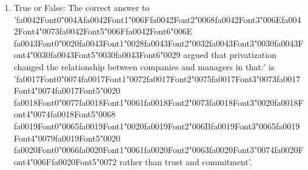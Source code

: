 \documentclass[12pt]{article}
\begin{document}
\begin{enumerate}[label=\arabic*.]
\item True or False: The correct answer to '{\csname fa0042Font0\endcsname\char"004A}{\csname fa0042Font1\endcsname\char"006F}{\csname fa0042Font2\endcsname\char"0068}{\csname fa0042Font3\endcsname\char"006E}{\csname fa0042Font4\endcsname\char"0073}{\csname fa0042Font5\endcsname\char"006F}{\csname fa0042Font6\endcsname\char"006E} {\csname fa0043Font0\endcsname\char"0020}{\csname fa0043Font1\endcsname\char"0028}{\csname fa0043Font2\endcsname\char"0032}{\csname fa0043Font3\endcsname\char"0030}{\csname fa0043Font4\endcsname\char"0030}{\csname fa0043Font5\endcsname\char"0030}{\csname fa0043Font6\endcsname\char"0029} argued that privatization changed the relationship between companies and managers in that:' is '{\csname fa0017Font0\endcsname\char"0074}{\csname fa0017Font1\endcsname\char"0072}{\csname fa0017Font2\endcsname\char"0075}{\csname fa0017Font3\endcsname\char"0073}{\csname fa0017Font4\endcsname\char"0074}{\csname fa0017Font5\endcsname\char"0020} {\csname fa0018Font0\endcsname\char"0077}{\csname fa0018Font1\endcsname\char"0061}{\csname fa0018Font2\endcsname\char"0073}{\csname fa0018Font3\endcsname\char"0020}{\csname fa0018Font4\endcsname\char"0074}{\csname fa0018Font5\endcsname\char"0068} {\csname fa0019Font0\endcsname\char"0065}{\csname fa0019Font1\endcsname\char"0020}{\csname fa0019Font2\endcsname\char"006B}{\csname fa0019Font3\endcsname\char"0065}{\csname fa0019Font4\endcsname\char"0079}{\csname fa0019Font5\endcsname\char"0020} {\csname fa0020Font0\endcsname\char"0066}{\csname fa0020Font1\endcsname\char"0061}{\csname fa0020Font2\endcsname\char"0063}{\csname fa0020Font3\endcsname\char"0074}{\csname fa0020Font4\endcsname\char"006F}{\csname fa0020Font5\endcsname\char"0072} rather than trust and commitment'.

\end{enumerate}
\end{document}
